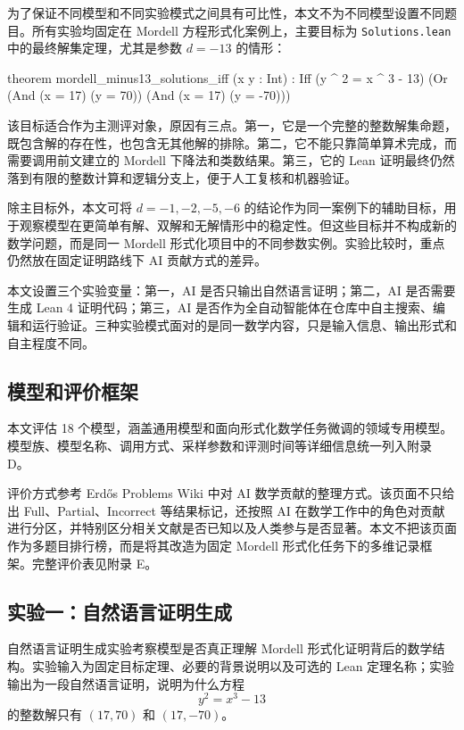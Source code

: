为了保证不同模型和不同实验模式之间具有可比性，本文不为不同模型设置不同题目。所有实验均固定在 Mordell 方程形式化案例上，主要目标为 \texttt{Solutions.lean} 中的最终解集定理，尤其是参数 \(d=-13\) 的情形：

\begin{leanlisting}
theorem mordell_minus13_solutions_iff (x y : Int) :
    Iff (y ^ 2 = x ^ 3 - 13)
      (Or (And (x = 17) (y = 70)) (And (x = 17) (y = -70)))
\end{leanlisting}

该目标适合作为主测评对象，原因有三点。第一，它是一个完整的整数解集命题，既包含解的存在性，也包含无其他解的排除。第二，它不能只靠简单算术完成，而需要调用前文建立的 Mordell 下降法和类数结果。第三，它的 Lean 证明最终仍然落到有限的整数计算和逻辑分支上，便于人工复核和机器验证。

除主目标外，本文可将 \(d=-1,-2,-5,-6\) 的结论作为同一案例下的辅助目标，用于观察模型在更简单有解、双解和无解情形中的稳定性。但这些目标并不构成新的数学问题，而是同一 Mordell 形式化项目中的不同参数实例。实验比较时，重点仍然放在固定证明路线下 AI 贡献方式的差异。

本文设置三个实验变量：第一，AI 是否只输出自然语言证明；第二，AI 是否需要生成 Lean 4 证明代码；第三，AI 是否作为全自动智能体在仓库中自主搜索、编辑和运行验证。三种实验模式面对的是同一数学内容，只是输入信息、输出形式和自主程度不同。

\subsection{模型和评价框架}

本文评估 18 个模型，涵盖通用模型和面向形式化数学任务微调的领域专用模型。模型族、模型名称、调用方式、采样参数和评测时间等详细信息统一列入附录 D。

评价方式参考 Erdős Problems Wiki 中对 AI 数学贡献的整理方式\cite{TaoErdosAIWiki2026}。该页面不只给出 Full、Partial、Incorrect 等结果标记，还按照 AI 在数学工作中的角色对贡献进行分区，并特别区分相关文献是否已知以及人类参与是否显著。本文不把该页面作为多题目排行榜，而是将其改造为固定 Mordell 形式化任务下的多维记录框架。完整评价表见附录 E。

\subsection{实验一：自然语言证明生成}

自然语言证明生成实验考察模型是否真正理解 Mordell 形式化证明背后的数学结构。实验输入为固定目标定理、必要的背景说明以及可选的 Lean 定理名称；实验输出为一段自然语言证明，说明为什么方程
\[
  y^2=x^3-13
\]
的整数解只有 \((17,70)\) 和 \((17,-70)\)。

